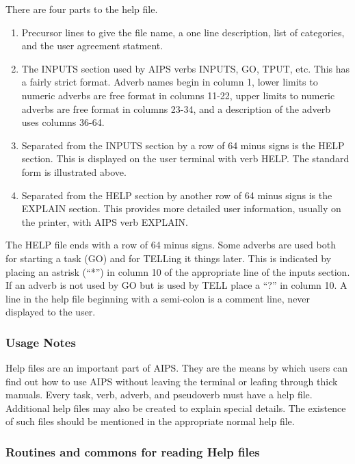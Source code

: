    There are four parts to the help file.
\begin{enumerate}
\item Precursor lines to give the file name, a one line description,
list of categories, and the user agreement statment.
\item The INPUTS section used by AIPS verbs INPUTS, GO, TPUT, etc.
This has a fairly strict format.  Adverb names begin in column 1,
lower limits to numeric adverbs are free format in columns 11-22,
upper limits to numeric adverbs are free format in columns 23-34, and
a description of the adverb uses columns 36-64.
\item Separated from the INPUTS section by a row of 64 minus signs is
the HELP section.  This is displayed on the user terminal with verb
HELP.  The standard form is illustrated above.
\item Separated from the HELP section by another row of 64 minus signs
is the EXPLAIN section.  This provides more detailed user information,
usually on the printer, with AIPS verb EXPLAIN.
\end{enumerate}

   The HELP file ends with a row of 64 minus signs.  Some adverbs are
used both for starting a task (GO) and for TELLing it things later.
This is indicated by placing an astrisk (``*'') in column 10 of the
appropriate line of the inputs section.  If an adverb is not used by
GO but is used by TELL place a ``?'' in column 10.  A line in the help
file beginning with a semi-colon is a comment line, never displayed to
the user.


\subsubsection{Usage Notes}


     Help files are an important part of AIPS.  They are the means by
which users can find out how to use AIPS without leaving the terminal
or leafing through thick manuals.  Every task, verb, adverb, and
pseudoverb must have a help file.  Additional help files may also be
created to explain special details.  The existence of such files should
be mentioned in the appropriate normal help file.


\subsubsection{Routines and commons for reading Help files}

